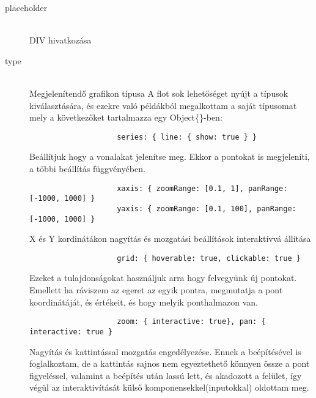 		\begin{description}
			\item[placeholder] \hfill \\ 
	 			DIV hivatkozása
	 		 \item[type] \hfill \\ 
	 			Megjelenítendő grafikon típusa
	 			\newline
	 			A flot sok lehetőséget nyújt a típusok kiválasztására, és ezekre való példákból megalkottam a saját típusomat mely a következőket tartalmazza egy Object\{\}-ben:
		 		
		 		\begin{verbatim}
		 			series: { line: { show: true } } 
		 		\end{verbatim}
				Beállítjuk hogy a vonalakat jelenítse meg. Ekkor a pontokat is megjeleníti, a többi beállítás függvényében.
		 		
		 		\begin{verbatim}
					xaxis: { zoomRange: [0.1, 1], panRange: [-1000, 1000] }
					yaxis: { zoomRange: [0.1, 100], panRange: [-1000, 1000] }
		 		\end{verbatim} 
		 		X és Y kordinátákon nagyítás és mozgatási beállítások interaktívvá állítása
			 	\begin{verbatim}
			 		grid: { hoverable: true, clickable: true }
			 	\end{verbatim} 
			 	Ezeket a tulajdonságokat használjuk arra hogy felvegyünk új pontokat.
			 	Emellett ha ráviszem az egeret az egyik pontra, megmutatja a pont koordinátáját, és értékeit, és hogy melyik ponthalmazon van.
			 	\begin{verbatim}
			 		zoom: { interactive: true}, pan: { interactive: true }
			 	\end{verbatim} 
			 	Nagyítás és kattintással mozgatás engedélyezése. \newline
				Ennek a beépítésével is foglalkoztam, de a kattintás sajnos nem egyeztethető könnyen össze a pont figyeléssel, valamint a beépítés után lassú lett, és akadozott a felület, így végül az interaktivítását külső komponensekkel(inputokkal) oldottam meg.


\end{description}
